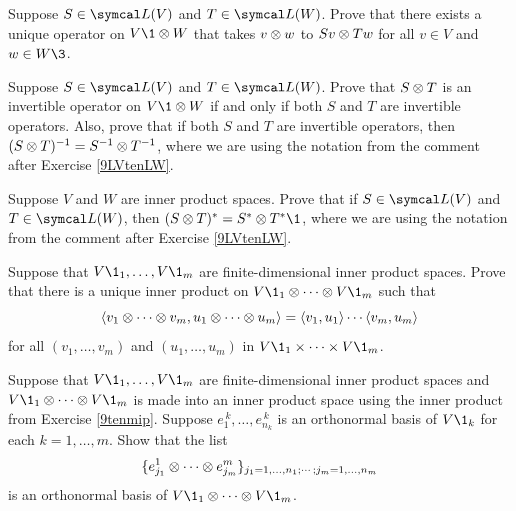 \begin{exercises}
\exercise
Suppose $S \in \L(V)$ and $T \in \L(W)$. Prove that there exists a unique operator on $V\1 \tensor W$ that takes
$v \otimes w$ to $Sv \otimes Tw$ for all $v \in V$ and $w \in W\3$.
\label{9LVtenLW}


\exercise
Suppose $S \in \L(V)$ and $T \in \L(W)$. Prove that $S \otimes T$ is an invertible operator on $V\1 \tensor W$ if and only if both $S$ and $T$ are invertible operators. Also, prove that  if both $S$ and $T$ are invertible operators, then
$(S \otimes T)^{-1} = S^{-1} \otimes T^{-1}$, where we are using the notation from the comment after Exercise \ref{9LVtenLW}.


\exercise
Suppose $V$ and $W$ are inner product spaces. Prove that if $S \in \L(V)$ and $T \in \L(W)$, then $(S \tensor T)^* = S^* \tensor T^*\1$, where we are using the notation from the comment after Exercise \ref{9LVtenLW}.\label{9STstar}


\exercise
Suppose that $V\1_1, \ldots, V\1_m$ are finite-dimensional inner product spaces. Prove that there is a unique inner product on
$V\1_1 \tensor \cdots \tensor V\1_m$ such that\label{9tenmip}
\[
\langle v_1 \otimes \cdots \otimes v_m, u_1 \otimes \cdots \otimes u_m \rangle =
\langle v_1, u_1\rangle \cdots \langle v_m, u_m\rangle
\]
for all $(v_1, \ldots, v_m)$ and $(u_1, \ldots, u_m)$ in $V\1_1 \times \cdots \times V\1_m$.


\exercise
Suppose that $V\1_1, \ldots, V\1_m$ are finite-dimensional inner product spaces and $V\1_1 \tensor \cdots \tensor V\1_m$ is made into an inner product space using the inner product from Exercise \ref{9tenmip}. Suppose $e_1^{\,k}, \ldots, e_{n_k}^{\,k}$ is an orthonormal basis of $V\1_k$ for each $k = 1, \ldots, m$. Show that the list\label{9tenmip2}
\[
\{e_{j_1}^1 \otimes \cdots \otimes e_{j_m}^m\}_{j_1 = 1, \ldots, n_1; \cdots ; j_m = 1, \ldots, n_m}
\]
is an orthonormal basis of $V\1_1 \tensor \cdots \tensor V\1_m$.


\end{exercises}

